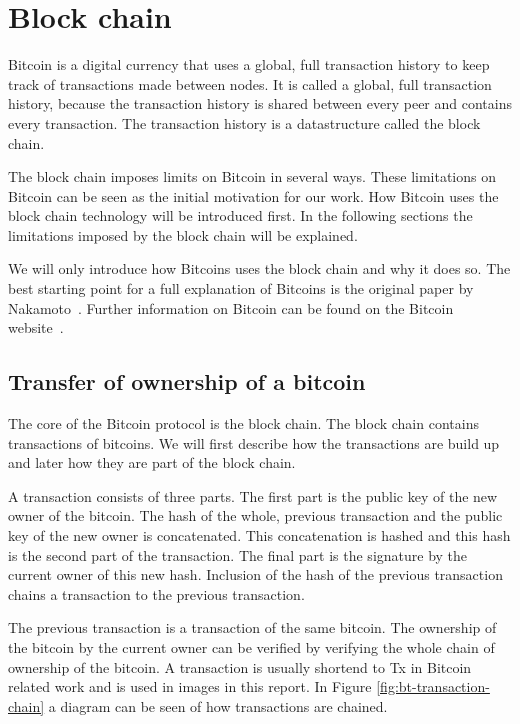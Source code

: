 \section{Block chain}
\label{sect:bitcoin}
Bitcoin is a digital currency that uses a global, full transaction history
to keep track of transactions made between nodes.
It is called a global, full transaction history,
because the transaction history is shared between every peer and contains every transaction.
The transaction history is a datastructure called the block chain.

The block chain imposes limits on Bitcoin in several ways.
These limitations on Bitcoin can be seen as the initial motivation for our work.
How Bitcoin uses the block chain technology will be introduced first.
In the following sections the limitations imposed by the block chain will be explained.

We will only introduce how Bitcoins uses the block chain and why it does so.
The best starting point for a full explanation of Bitcoins
is the original paper by Nakamoto~\cite{Nakamoto-bitcoin}.
Further information on Bitcoin can be found on the Bitcoin website~\cite{Bitcoin.org-site}.

\subsection{Transfer of ownership of a bitcoin}
The core of the Bitcoin protocol is the block chain.
The block chain contains transactions of bitcoins.
We will first describe how the transactions are build up
and later how they are part of the block chain.

A transaction consists of three parts.
The first part is the public key of the new owner of the bitcoin.
The hash of the whole, previous transaction and the public key of the new owner is concatenated.
This concatenation is hashed and this hash is the second part of the transaction.
The final part is the signature by the current owner of this new hash.
Inclusion of the hash of the previous transaction chains a transaction to the previous transaction.

The previous transaction is a transaction of the same bitcoin.
The ownership of the bitcoin by the current owner can be verified
by verifying the whole chain of ownership of the bitcoin.
A transaction is usually shortend to Tx in Bitcoin related work and is used in images in this report.
In Figure \ref{fig:bt-transaction-chain} a diagram can be seen of how transactions are chained.

